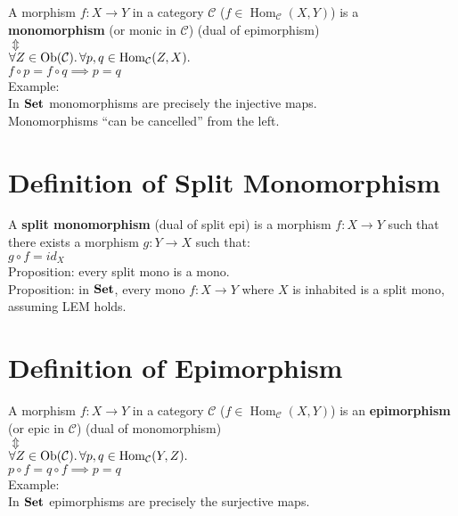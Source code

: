 \documentclass[a4paper, twoside, english, 11pt]{book}
\DeclareMathOperator{\Hom}{Hom}
\DeclareMathOperator{\Ob}{Ob}
\newcommand{\C}{\mathcal C}
\newcommand{\catname}[1]{{\normalfont\textbf{#1}}}
\newcommand{\Set}{\catname{Set}}
\begin{document}
A morphism $f : X \rightarrow Y$ in a category $\C$ ($f \in \Hom_\C(X, Y)$) is a \textbf{monomorphism} (or monic in $\C$) (dual of epimorphism) \\
\indent
$\Updownarrow$ \\ %
$\forall Z \in \Ob(\C) \ldotp \forall p, q \in \Hom_\C(Z, X) \ldotp$ \\
$f \circ p = f \circ q \implies p = q$ \\

\noindent
Example: \\
In $\Set$ monomorphisms are precisely the injective maps. \\

\noindent
Monomorphisms ``can be cancelled'' from the left.



\section{Definition of Split Monomorphism}

A \textbf{split monomorphism} (dual of split epi) is a morphism $f : X \rightarrow Y$ such that there exists a morphism $g : Y \rightarrow X$ such that: \\

$g \circ f = id_X$ \\

\noindent
Proposition: every split mono is a mono. \\
Proposition: in $\Set$, every mono $f : X \rightarrow Y$ where $X$ is inhabited is a split mono, assuming LEM holds.



\section{Definition of Epimorphism}

A morphism $f : X \rightarrow Y$ in a category $\C$ ($f \in \Hom_\C(X, Y)$) is an \textbf{epimorphism} (or epic in $\C$) (dual of monomorphism) \\
\indent
$\Updownarrow$ \\ %
$\forall Z \in \Ob(\C) \ldotp \forall p, q \in \Hom_\C(Y, Z) \ldotp$ \\
$p \circ f = q \circ f \implies p = q$ \\

\noindent
Example: \\
In $\Set$ epimorphisms are precisely the surjective maps. \\
\end{document}

